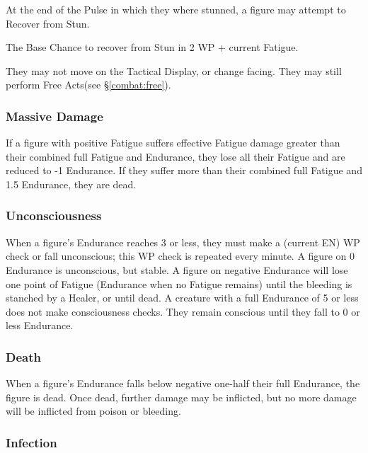 \begin{multicols*}{3}
\begin{Itemize}
\item At the end of the Pulse in which they where stunned, a figure may
attempt to Recover from Stun.

\item The Base Chance to recover from Stun in 2 \x WP + current Fatigue.

\item They may not move on the Tactical Display, or change facing. They
may still perform Free Acts(see \S\ref{combat:free}).
\end{Itemize}

\subsubsection{Massive Damage}

If a figure with positive Fatigue suffers effective Fatigue damage
greater than their combined full Fatigue and Endurance, they lose all
their Fatigue and are reduced to -1 Endurance. If they suffer more
than their combined full Fatigue and 1.5  \x  Endurance, they are dead.

\subsubsection{Unconsciousness}

When a figure's Endurance reaches 3 or less, they must make a (current
EN)  \x  WP check or fall unconscious; this WP check is repeated every
minute. A figure on 0 Endurance is unconscious, but stable. A figure
on negative Endurance will lose one point of Fatigue (Endurance when
no Fatigue remains) until the bleeding is stanched by a Healer, or
until dead. A creature with a full Endurance of 5 or less does not
make consciousness checks. They remain conscious until they fall to 0
or less Endurance.

\subsubsection{Death}

When a figure's Endurance falls below negative one-half their full
Endurance, the figure is dead. Once dead, further damage may be
inflicted, but no more damage will be inflicted from poison or
bleeding.

\subsubsection{Infection}


\end{multicols*}
